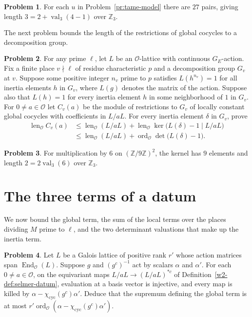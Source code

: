 \documentclass[reqno]{amsart}
\theoremstyle{definition}
\newtheorem{problem}{Problem}[section]
\theoremstyle{plain}
\theoremstyle{remark}
\newcommand{\Z}{\mathbb Z}
\newcommand{\Oc}{\mathcal O}
\newcommand{\cyc}{\chi_{\mathrm{cyc}}}
\newcommand{\val}{\operatorname{val}}
\newcommand{\ord}{\operatorname{ord}}
\newcommand{\len}{\operatorname{len}}
\begin{document}
\begin{problem}\label{pr:tame-count}
For each \(u\) in Problem~\ref{pr:tame-model} there are \(27\) pairs, giving length \(3=2+\val_3(4-1)\) over \(\Z_3\).
\end{problem}

The next problem bounds the length of the restrictions of global cocycles to a decomposition group.

\begin{problem}\label{pr:local-bound}
For any prime \(\ell\), let \(L\) be an \(\Oc\)-lattice with continuous \(G_E\)-action.  Fix a finite place \(v\nmid\ell\) of residue characteristic \(p\) and a decomposition group \(G_v\) at \(v\).  Suppose some positive integer \(n_v\) prime to \(p\) satisfies \(L(h^{n_v})=1\) for all inertia elements \(h\) in \(G_v\), where \(L(g)\) denotes the matrix of the action.  Suppose also that \(L(h)=1\) for every inertia element \(h\) in some neighborhood of \(1\) in \(G_v\).  For \(0\ne a\in\Oc\) let \(C_v(a)\) be the module of restrictions to \(G_v\) of locally constant global cocycles with coefficients in \(L/aL\).  For every inertia element \(\delta\) in \(G_v\), prove
\[
  \begin{aligned}
    \len_{\Oc} C_v(a)&\le \len_{\Oc}(L/aL)+\len_{\Oc}\ker\bigl(L(\delta)-1\mid L/aL\bigr)\\
     &\le \len_{\Oc}(L/aL)+\ord_{\Oc}\det\bigl(L(\delta)-1\bigr).
  \end{aligned}
\]
\end{problem}

\begin{problem}\label{pr:scalar-model}
For multiplication by \(6\) on \((\Z/9\Z)^2\), the kernel has \(9\) elements and length \(2=2\val_3(6)\) over \(\Z_3\).
\end{problem}

\section{The three terms of a datum}\label{sec:bounds}

We now bound the global term, the sum of the local terms over the places dividing \(M\) prime to \(\ell\), and the two determinant valuations that make up the inertia term.

\begin{problem}\label{pr:glob}
Let \(L\) be a Galois lattice of positive rank \(r'\) whose action matrices span \(\operatorname{End}_{\Oc}(L)\).  Suppose \(g\) and \((g^c)^{-1}\) act by scalars \(\alpha\) and \(\alpha'\).  For each \(0\ne a\in\Oc\), on the equivariant maps \(L/aL\to (L/aL)^{*c}\) of Definition~\ref{w2-def:selmer-datum}, evaluation at a basis vector is injective, and every map is killed by \(\alpha-\cyc(g^c)\alpha'\).  Deduce that the supremum defining the global term is at most \(r'\ord_{\Oc}(\alpha-\cyc(g^c)\alpha')\).
\end{problem}
\end{document}
